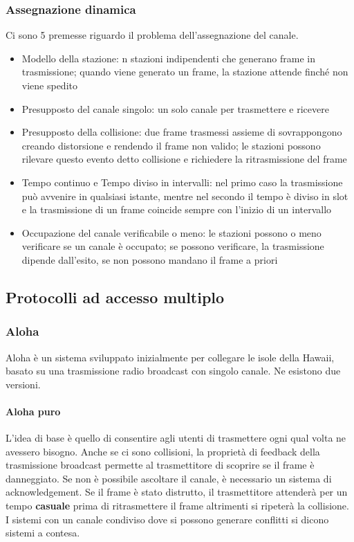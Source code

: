 \subsubsection{Assegnazione dinamica}
Ci sono 5 premesse riguardo il problema dell'assegnazione del canale.
\begin{itemize}
    \item Modello della stazione: n stazioni indipendenti che generano frame in trasmissione;
    quando viene generato un frame, la stazione attende finché non viene spedito
    \item Presupposto del canale singolo: un solo canale per trasmettere e ricevere
    \item Presupposto della collisione: due frame trasmessi assieme di sovrappongono creando distorsione e rendendo il frame non valido;
    le stazioni possono rilevare questo evento detto collisione e richiedere la ritrasmissione del frame
    \item Tempo continuo e Tempo diviso in intervalli: nel primo caso la trasmissione può avvenire in qualsiasi istante,
    mentre nel secondo il tempo è diviso in slot e la trasmissione di un frame coincide sempre con l'inizio di un intervallo
    \item Occupazione del canale verificabile o meno: le stazioni possono o meno verificare se un canale è occupato;
    se possono verificare, la trasmissione dipende dall'esito, se non possono mandano il frame a priori
\end{itemize}

\subsection{Protocolli ad accesso multiplo} %

\subsubsection{Aloha}
Aloha è un sistema sviluppato inizialmente per collegare le isole della Hawaii, basato su una trasmissione radio broadcast con singolo canale.
Ne esistono due versioni.

\paragraph{Aloha puro}
L'idea di base è quello di consentire agli utenti di trasmettere ogni qual volta ne avessero bisogno.
Anche se ci sono collisioni, la proprietà di feedback della trasmissione broadcast permette al trasmettitore di scoprire se il frame è danneggiato.
Se non è possibile ascoltare il canale, è necessario un sistema di acknowledgement.
Se il frame è stato distrutto, il trasmettitore attenderà per un tempo \textbf{casuale} prima di ritrasmettere il frame altrimenti si ripeterà la collisione.
I sistemi con un canale condiviso dove si possono generare conflitti si dicono sistemi a contesa.

